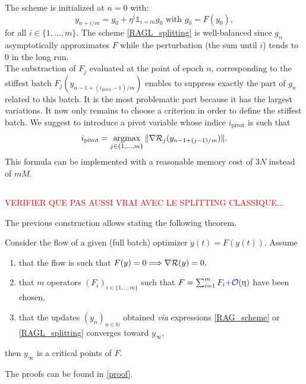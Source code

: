 \documentclass[article,authoryear,jmlmc]{beg_32}             %
\begin{document}
The scheme is initialized at $n=0$ with:
\begin{equation*}
	y_{n+i/m} = y_0 + \eta^i \mathds{1}_{i=m} g_0 \text{ with } g_0 = F(y_0),
\end{equation*}
for all $i \in \{1,\dots,m\}$. 
The scheme \eqref{RAGL_splitting} is well-balanced since $g_n$ asymptotically approximates $F$ while the perturbation (the sum until $i$) tends to 0 in the long run. \\
{The substraction of $F_j$ evaluated at the point of epoch $n$, corresponding to the stiffest batch $F_j\left(y_{n-1+(i_{\text{pivot}}-1)/m}\right)$ enables to suppress exactly the
part of $g_n$ related to this batch. It is the most problematic part because it has the largest variations. It now only remains to choose a criterion in order to define the
stiffest batch. We suggest to introduce a pivot variable whose indice  $i_{\text{pivot}}$ is such that
$$i_{\text{pivot}} = \operatorname*{\arg\!\textrm{max}}_{j\in\{1,...,m\}} \|\nabla \mathcal{R}_j(y_{n-1+(j-1)/m})\|.$$}
This formula can be implemented with a reasonable memory cost of $3N$ instead of $mM$.

\begin{remark}
\end{remark}

\subsection{}
\label{th_prop}
\textcolor{red}{VERIFIER QUE PAS AUSSI VRAI AVEC LE SPLITTING CLASSIQUE...}

The previous construction allows stating the following theorem.
\begin{theorem}
\label{th}
  Consider the flow of a given (full batch) optimizer
$
\dot{y}(t) = F(y(t)).
$
Assume
\begin{enumerate}
\item  that the flow is such that 
$
F(y)=0 \Longrightarrow \nabla \mathcal{R}(y)=0,
$
\item that $m$ operators $(F_i)_{i\in\{1,..,m\}}$
such that $F=\sum_{i=1}^m F_i \textcolor{blue}{+\mathcal{O}(\upeta)}$ have been chosen, 
\item that the updates $(y_n)_{n\in\mathbb{N}}$ obtained {\em via} expressions \eqref{RAG_scheme} or \eqref{RAGL_splitting}  converges toward $y_\infty$,
\end{enumerate}
 then $y_\infty$ is a critical points of $F$. 
\end{theorem}
The proofs can be found in \ref{proof}.\\
\end{document}
